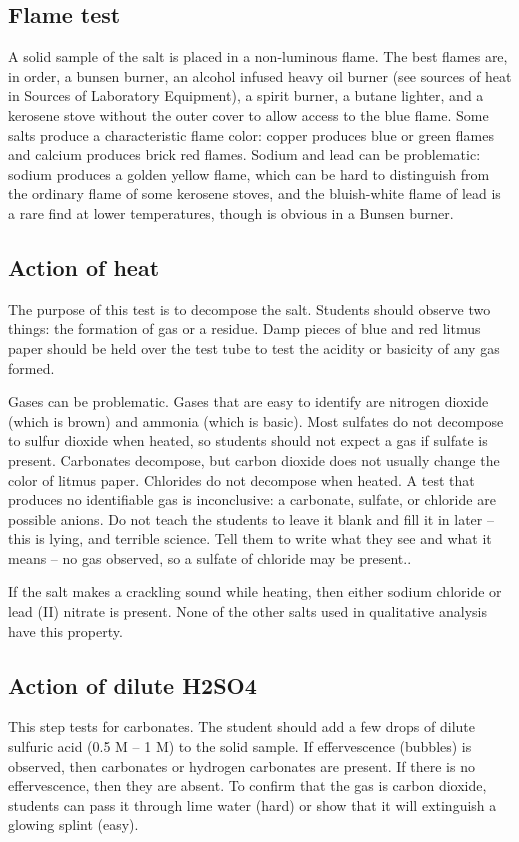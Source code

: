 \subsection{Flame test}
A solid sample of the salt is placed in a non-luminous flame. 
The best flames are, 
in order, 
a bunsen burner, 
an alcohol infused heavy oil burner 
(see sources of heat in Sources of Laboratory Equipment), 
a spirit burner, 
a butane lighter, 
and a kerosene stove without the outer cover 
to allow access to the blue flame. 
Some salts produce a characteristic flame color: 
copper produces blue or green flames and calcium produces brick red flames. 
Sodium and lead can be problematic: sodium produces a golden yellow flame, 
which can be hard to distinguish 
from the ordinary flame of some kerosene stoves, 
and the bluish-white flame of lead is a rare find at lower temperatures, 
though is obvious in a Bunsen burner.

\subsection{Action of heat}
The purpose of this test is to decompose the salt. 
Students should observe two things: the formation of gas or a residue. 
Damp pieces of blue and red litmus paper should be held 
over the test tube to test the acidity or basicity of any gas formed.

Gases can be problematic. 
Gases that are easy to identify are nitrogen dioxide 
(which is brown) and ammonia (which is basic). 
Most sulfates do not decompose to sulfur dioxide when heated, 
so students should not expect a gas if sulfate is present. 
Carbonates decompose, 
but carbon dioxide does not usually change the color of litmus paper. 
Chlorides do not decompose when heated. 
A test that produces no identifiable gas is inconclusive: a carbonate, 
sulfate, 
or chloride are possible anions. 
Do not teach the students to leave it blank and fill it in later – 
this is lying, 
and terrible science. 
Tell them to write what they see and what it means – no gas observed, 
so a sulfate of chloride may be present..

If the salt makes a crackling sound while heating, 
then either sodium chloride or lead (II) nitrate is present. 
None of the other salts used in qualitative analysis have this property.

\subsection{Action of dilute H2SO4}
This step tests for carbonates. 
The student should add a few drops of dilute sulfuric acid 
(0.5 M – 1 M) to the solid sample. 
If effervescence (bubbles) is observed, 
then carbonates or hydrogen carbonates are present. 
If there is no effervescence, 
then they are absent. 
To confirm that the gas is carbon dioxide, 
students can pass it through lime water 
(hard) or show that it will extinguish a glowing splint (easy).

